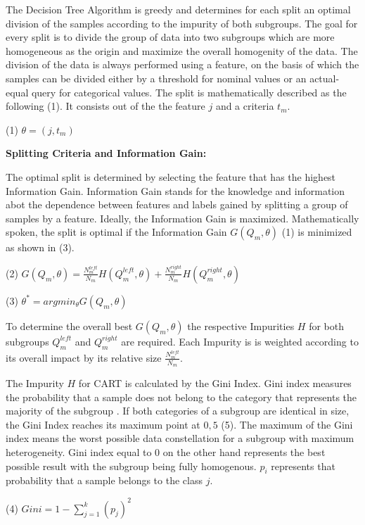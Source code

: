 The Decision Tree Algorithm is greedy and determines for each split an optimal division of the samples according to 
the impurity of both subgroups. The goal for every split is to divide the group of data into two subgroups which are 
more homogeneous as the origin and maximize the overall homogenity of the data. The division of the data is 
always performed using a feature, on the basis of which the samples can be divided either by a threshold for 
nominal values or an actual-equal query for categorical values. The split is mathematically described as the 
following (1). It consists out of the the feature \(j\) and a criteria \(t_{m}\).

(1) \(\theta = (j, t_{m})\)

\textbf{Splitting Criteria and Information Gain:}

The optimal split is determined by selecting the feature that has the highest Information Gain. Information Gain 
stands for the knowledge and information abot the dependence between features and labels gained by splitting a group 
of samples by a feature. Ideally, the Information Gain is maximized. Mathematically spoken, the split is optimal if 
the Information Gain \(G(Q_{m}, \theta)\) (1) is minimized as shown in (3). 

(2) \(G(Q_{m},\theta) = \frac{N^{left}_{m}}{N_{m}} H(Q^{left}_{m}, \theta ) + \frac{N^{right}_{m}}{N_{m}} H(Q^{right}_{m}, \theta ) \)

(3) \(\theta ^* = argmin_{\theta}  G(Q_{m}, \theta)\)

To determine the overall best \(G(Q_{m}, \theta)\) the respective Impurities \(H\) for both subgroups \(Q^{left}_{m}\) 
and \(Q^{right}_{m}\) are required. Each Impurity is is weighted according to its overall impact by its relative size 
\(\frac{N^{left}_{m}}{N_{m}}\).

The Impurity \(H\) for CART is calculated by the Gini Index. Gini index measures the probability that a sample 
does not belong to the category that represents the majority of the subgroup \cite[p.335]{James2021}. If both 
categories of a subgroup are identical in size, the Gini Index reaches its maximum point at \(0,5\) (5). The 
maximum of the Gini index means the worst possible data constellation for a subgroup with maximum heterogeneity. 
Gini index equal to \(0\) on the other hand represents the best possible result with the subgroup being fully 
homogenous. \(p_{i}\) represents that probability that a sample belongs to the class \(j\).

(4) \(Gini = 1 - \sum ^k_{j = 1}(p_{j})^2\)

